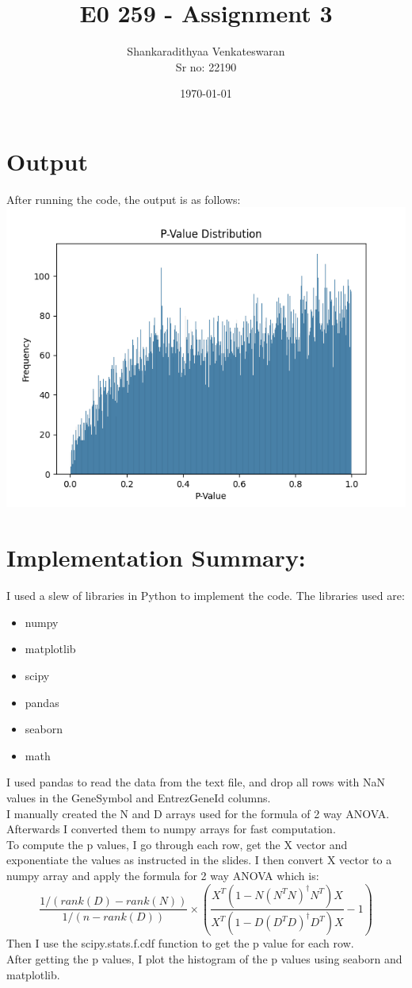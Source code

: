 \documentclass[12pt]{article}
\title{E0 259 - Assignment 3}
\author{Shankaradithyaa Venkateswaran\\ Sr no: 22190}
\date{\today}
\begin{document}
\begin{titlepage}
    \maketitle
\end{titlepage}

\section*{Output}
After running the code, the output is as follows:\\
\includegraphics[width=1\textwidth]{P-Value Distribution.png}

\section*{Implementation Summary:}
I used a slew of libraries in Python to implement the code. The libraries used are:
\begin{itemize}
    \item numpy
    \item matplotlib
    \item scipy
    \item pandas
    \item seaborn
    \item math
\end{itemize}
I used pandas to read the data from the text file, and drop all rows with NaN values in the GeneSymbol and EntrezGeneId columns.\\
I manually created the N and D arrays used for the formula of 2 way ANOVA. Afterwards I converted them to numpy arrays for fast computation.\\
To compute the p values, I go through each row, get the X vector and exponentiate the values as instructed in the slides. I then convert X vector to a numpy array and apply the formula for 2 way ANOVA which is:\\
$$\frac{1/(rank(D) - rank(N))}{1/(n - rank(D))} \times (\frac{X^T(1 - N(N^TN)^{\dagger}N^T)X}{X^T(1 - D(D^TD)^{\dagger}D^T)X} - 1)$$
Then I use the scipy.stats.f.cdf function to get the p value for each row.\\
After getting the p values, I plot the histogram of the p values using seaborn and matplotlib.\\
\end{document}
